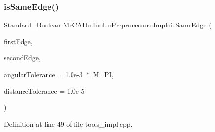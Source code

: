 \subsubsection{\texorpdfstring{is\+Same\+Edge()}{isSameEdge()}\hspace{0.1cm}{\footnotesize\ttfamily [2/2]}}
{\footnotesize\ttfamily Standard\+\_\+\+Boolean Mc\+C\+A\+D\+::\+Tools\+::\+Preprocessor\+::\+Impl\+::is\+Same\+Edge (\begin{DoxyParamCaption}\item[{const Topo\+D\+S\+\_\+\+Edge \&}]{first\+Edge,  }\item[{const Topo\+D\+S\+\_\+\+Edge \&}]{second\+Edge,  }\item[{Standard\+\_\+\+Real}]{angular\+Tolerance = {\ttfamily 1.0e-\/3~$\ast$~M\+\_\+PI},  }\item[{Standard\+\_\+\+Real}]{distance\+Tolerance = {\ttfamily 1.0e-\/5} }\end{DoxyParamCaption})}



Definition at line 49 of file tools\+\_\+impl.\+cpp.


